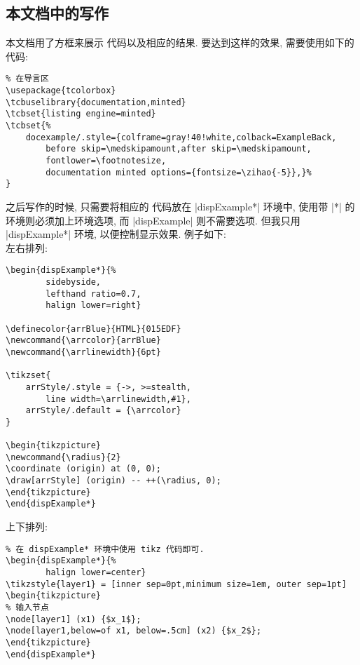 \subsection{本文档中的写作}

本文档用了方框来展示 \tikzlogo 代码以及相应的结果. 要达到这样的效果, 需要使用如下的代码:

\begin{verbatim}
% 在导言区
\usepackage{tcolorbox}
\tcbuselibrary{documentation,minted}
\tcbset{listing engine=minted}
\tcbset{%
	docexample/.style={colframe=gray!40!white,colback=ExampleBack,
		before skip=\medskipamount,after skip=\medskipamount,
		fontlower=\footnotesize, 
		documentation minted options={fontsize=\zihao{-5}},}%
}
\end{verbatim}

之后写作的时候, 只需要将相应的 \tikzlogo 代码放在 \lxcode|dispExample*| 环境中, 使用带 \lxcode|*| 的环境则必须加上环境选项, 而 \lxcode|dispExample| 则不需要选项. 但我只用 \lxcode|dispExample*| 环境, 以便控制显示效果. 例子如下:\\[-.3cm]

\noindent 左右排列:

\begin{verbatim}
\begin{dispExample*}{%
		sidebyside,
		lefthand ratio=0.7,
		halign lower=right}
	
\definecolor{arrBlue}{HTML}{015EDF}
\newcommand{\arrcolor}{arrBlue}
\newcommand{\arrlinewidth}{6pt}

\tikzset{
	arrStyle/.style = {->, >=stealth, 
		line width=\arrlinewidth,#1},
	arrStyle/.default = {\arrcolor}
}	

\begin{tikzpicture}
\newcommand{\radius}{2}
\coordinate (origin) at (0, 0);
\draw[arrStyle] (origin) -- ++(\radius, 0);
\end{tikzpicture}
\end{dispExample*}
\end{verbatim}


\noindent 上下排列:

\begin{verbatim}
% 在 dispExample* 环境中使用 tikz 代码即可.
\begin{dispExample*}{%
		halign lower=center}
\tikzstyle{layer1} = [inner sep=0pt,minimum size=1em, outer sep=1pt]
\begin{tikzpicture}
% 输入节点
\node[layer1] (x1) {$x_1$};
\node[layer1,below=of x1, below=.5cm] (x2) {$x_2$};
\end{tikzpicture}
\end{dispExample*}
\end{verbatim}